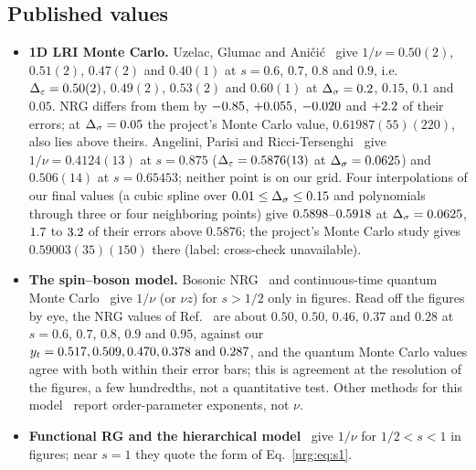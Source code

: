 \begin{table}[ht]\centering\scriptsize\setlength{\tabcolsep}{3.5pt}
\caption{NRG against the 1D cluster Monte Carlo study at the common points. MC value with $\sigma_{\rm stat}$ and $\sigma_{\rm sys}$ in
units of the last digit, and its label (Sec.~\ref{nrg:sec:mc}); NRG minus MC; ``ratio'' is $|{\rm NRG}-{\rm MC}|$ divided by
$\sigma_{\rm stat}+\sigma_{\rm sys}+\dtot$ (shown also for the cross-check-failed points, which are not infinite-size values); MC
crossing extrapolation with $\sigma_\infty$ and $\Delta_{\omega'}$. MC values are quoted as that study gives them. $^\ast$Not
converged in NRG, not used.}\label{nrg:tab:mc}

\end{table}

\subsection{Published values}\label{nrg:sec:literature}
\begin{itemize}
\item \textbf{1D LRI Monte Carlo.} Uzelac, Glumac and Ani\v{c}i\'c~\cite{nrg:UGA01} give $1/\nu=0.50(2)$, $0.51(2)$, $0.47(2)$ and $0.40(1)$ at
  $s=0.6$, $0.7$, $0.8$ and $0.9$, i.e.\ $\Delta_\varepsilon=0.50(2)$, $0.49(2)$, $0.53(2)$ and $0.60(1)$ at $\Delta_\sigma=0.2$, $0.15$, $0.1$ and $0.05$. NRG
  differs from them by $-0.85$, $+0.055$, $-0.020$ and $+2.2$ of their errors; at $\Delta_\sigma=0.05$ the
  project's Monte Carlo value, $0.61987(55)(220)$, also lies above theirs. Angelini, Parisi and Ricci-Tersenghi~\cite{nrg:APR14} give
  $1/\nu=0.4124(13)$ at $s=0.875$ ($\Delta_\varepsilon=0.5876(13)$ at $\Delta_\sigma=0.0625$) and $0.506(14)$ at $s=0.65453$; neither point is on our grid.
  Four interpolations of our final values (a cubic spline over $0.01\le\Delta_\sigma\le0.15$ and polynomials through three or four neighboring
  points) give $0.5898$--$0.5918$ at $\Delta_\sigma=0.0625$, $1.7$ to $3.2$ of their errors above $0.5876$; the project's
  Monte Carlo study gives $0.59003(35)(150)$ there (label: cross-check unavailable).
\item \textbf{The spin--boson model.} Bosonic NRG~\cite{nrg:Bulla2003,nrg:Vojta2005} and continuous-time quantum Monte
  Carlo~\cite{nrg:WRVB09} give $1/\nu$ (or $\nu z$) for $s>1/2$ only in figures. Read off the figures by eye, the NRG values of
  Ref.~\cite{nrg:Vojta2005} are about $0.50$, $0.50$, $0.46$, $0.37$ and $0.28$ at $s=0.6$, $0.7$, $0.8$, $0.9$ and $0.95$, against our
  $y_t=0.517, 0.509, 0.470, 0.378\text{ and }0.287$, and the quantum Monte Carlo values agree with both within their error bars; this is
  agreement at the resolution of the figures, a few hundredths, not a quantitative test. Other methods for this
  model~\cite{nrg:AF09,nrg:Guo2012} report order-parameter exponents, not $\nu$.
\item \textbf{Functional RG and the hierarchical model}~\cite{nrg:PGTD26} give $1/\nu$ for $1/2<s<1$ in figures; near $s=1$ they quote
  the form of Eq.~\eqref{nrg:eq:s1}.
\end{itemize}

